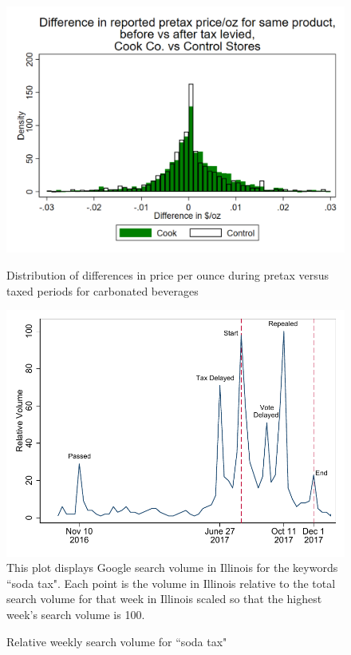 \documentclass[12pt]{article}
\begin{document}
\clearpage
\begin{figure}[t]\centering
	\includegraphics[width = \textwidth]{../figures/ppozdiff.png}\label{pricediff}
	\caption{Distribution of differences in price per ounce during pretax versus taxed periods for carbonated beverages}
\end{figure}

\clearpage
\begin{figure}[t]\centering
  \caption{Relative weekly search volume for ``soda tax"}
  \label{gtrends}
	\includegraphics[width = \textwidth]{../figures/gtrends.pdf}
	\footnotesize This plot displays Google search volume in Illinois for the keywords ``soda tax". Each point is the volume in Illinois relative to the total search volume for that week in Illinois scaled so that the highest week's search volume is 100.
\end{figure}
\end{document}
